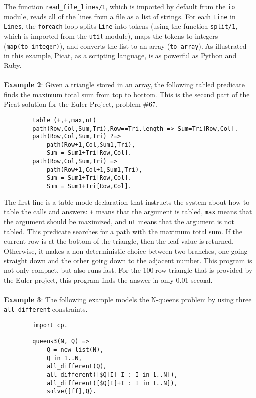 \documentclass{article}[12pt]
\begin{document}
\large{\indent The function \texttt{read\_file\_lines/1}, which is imported by default from the
\texttt{io} module, reads all of the lines from a file as a list of strings.
For each \texttt{Line} in \texttt{Lines}, the \texttt{foreach} loop splits \texttt{Line} into tokens
(using the function \texttt{split/1}, which is imported from the \texttt{util} module),
maps the tokens to integers (\texttt{map(to\_integer)}), and converts the list
to an array (\texttt{to\_array}). As illustrated in this example, Picat, as a
scripting language, is as powerful as Python and Ruby.}
\\
\\
\large{{\bf Example 2}: Given a triangle stored in an array, the following tabled
predicate finds the maximum total sum from top to bottom. This is the
second part of the Picat solution for the Euler Project, problem \#67.}

\begin{verbatim}
        table (+,+,max,nt) 
        path(Row,Col,Sum,Tri),Row==Tri.length => Sum=Tri[Row,Col].
        path(Row,Col,Sum,Tri) ?=> 
            path(Row+1,Col,Sum1,Tri),
            Sum = Sum1+Tri[Row,Col].
        path(Row,Col,Sum,Tri) => 
            path(Row+1,Col+1,Sum1,Tri),
            Sum = Sum1+Tri[Row,Col].    
            Sum = Sum1+Tri[Row,Col].    
\end{verbatim}

\large{\indent The first line is a table mode declaration that instructs the system
about how to table the calls and answers: \texttt{+} means that the argument
is tabled, \texttt{max} means that the argument should be maximized, and
\texttt{nt} means that the argument is not tabled. This predicate searches
for a path with the maximum total sum. If the current row is at the
bottom of the triangle, then the leaf value is returned. Otherwise,
it makes a non-deterministic choice between two branches, one going
straight down and the other going down to the adjacent number. This
program is not only compact, but also runs fast. For the 100-row
triangle that is provided by the Euler project, this program finds
the answer in only 0.01 second.}
\\
\\
\large{{\bf Example 3}: The following example models the N-queens problem by using
three \texttt{all\_different} constraints. }

\begin{verbatim}
        import cp.
        
        queens3(N, Q) =>
            Q = new_list(N),
            Q in 1..N,
            all_different(Q),
            all_different([$Q[I]-I : I in 1..N]),
            all_different([$Q[I]+I : I in 1..N]),
            solve([ff],Q).
\end{verbatim}
\end{document}
